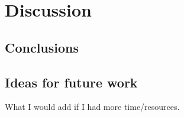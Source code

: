 \chapter{Discussion}
\label{chapter4}

\section{Conclusions}

\section{Ideas for future work}
What I would add if I had more time/resources.

